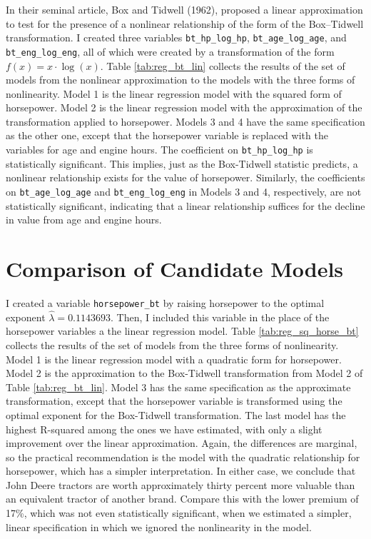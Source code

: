 \documentclass[11pt]{paper}
\begin{document}
In their seminal article, Box and Tidwell (1962), 
proposed a linear approximation to test for the presence of 
a nonlinear relationship of the form of the Box--Tidwell transformation. 
I created three variables 
\texttt{bt\_hp\_log\_hp}, \texttt{bt\_age\_log\_age}, and \texttt{bt\_eng\_log\_eng}, 
all of which were created by a transformation of the form $f(x) = x\cdot\log(x)$. 
Table \ref{tab:reg_bt_lin} collects the results
of the set of models from the nonlinear approximation to the models with the three forms of nonlinearity.
Model 1 is the linear regression model with 
the squared form of horsepower.
Model 2 is the linear regression model with 
the approximation of the transformation applied to horsepower. 
Models 3 and 4 
have the same specification as the other one, 
except that the horsepower variable is replaced with
the variables for age and engine hours. 
The coefficient on \texttt{bt\_hp\_log\_hp}
is statistically significant. 
This implies, just as the Box-Tidwell statistic predicts, 
a nonlinear relationship exists for the value of horsepower.
Similarly, the coefficients on 
\texttt{bt\_age\_log\_age} and \texttt{bt\_eng\_log\_eng}
in Models 3 and 4, respectively, 
are not statistically significant, 
indicating that
a linear relationship suffices for the decline in value from age and engine hours.




\pagebreak
\section{Comparison of Candidate Models}

I created a variable \texttt{horsepower\_bt}
by raising horsepower to the optimal exponent 
$\hat{\lambda} = 0.1143693$. 
Then, I included this variable in the place of 
the horsepower variables a the linear regression model.
% 
Table \ref{tab:reg_sq_horse_bt} collects the results
of the set of models from the three forms of nonlinearity.
Model 1 is the linear regression model with 
a quadratic form for horsepower. 
Model 2 
is the approximation to the Box-Tidwell transformation
from Model 2 of Table \ref{tab:reg_bt_lin}. 
Model 3
has the same specification as the approximate transformation, 
except that the horsepower variable is transformed using the optimal
exponent for the Box-Tidwell transformation. 
% 
The last model has the highest R-squared
among the ones we have estimated, 
with only a slight improvement over the linear approximation.
Again, the differences are marginal, so the practical recommendation
is the model with the quadratic relationship for horsepower, 
which has a simpler interpretation.
In either case, we conclude that John Deere tractors are worth
approximately thirty percent more valuable
than an equivalent tractor of another brand. 
Compare this with the lower premium of 17\%, 
which was not even statistically significant, 
when we estimated a simpler, linear specification
in which we ignored the nonlinearity in the model. 





\end{document}
